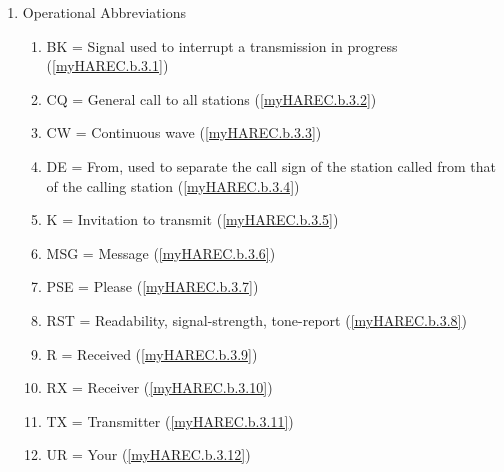 \begin{enumerate}
\begin{enumerate}
  (\ref{myHAREC.b.2.21})\label{HAREC.b.2.21}
\item QSO  = I can communicate ... direct
  (\ref{myHAREC.b.2.22})\label{HAREC.b.2.22}
\item QSY? = Shall I change to transmission on another frequency?
  (\ref{myHAREC.b.2.23})\label{HAREC.b.2.23}
\item QSY  = Change transmission to another frequency
  (\ref{myHAREC.b.2.24})\label{HAREC.b.2.24}
\item QRX? = When will you call again?
  (\ref{myHAREC.b.2.25})\label{HAREC.b.2.25}
\item QRX  = I will call you again at ... hours on ... kHz (or MHz)
  (\ref{myHAREC.b.2.26})\label{HAREC.b.2.26}
\item QTH? = What is your position in latitude and longitude (or according to
  any other indication)? (\ref{myHAREC.b.2.27})\label{HAREC.b.2.27}
\item QTH  = My position is  ... latitude, ... longitude (or according to any
  other indication) (\ref{myHAREC.b.2.28})\label{HAREC.b.2.28}
\end{enumerate}

\item Operational Abbreviations
\begin{enumerate}
\item BK = Signal used to interrupt a transmission in progress
  (\ref{myHAREC.b.3.1})\label{HAREC.b.3.1}
\item CQ = General call to all stations
  (\ref{myHAREC.b.3.2})\label{HAREC.b.3.2}
\item CW = Continuous wave
  (\ref{myHAREC.b.3.3})\label{HAREC.b.3.3}
\item DE = From, used to separate the call sign of the station called from that
  of the calling station (\ref{myHAREC.b.3.4})\label{HAREC.b.3.4}
\item K = Invitation to transmit
  (\ref{myHAREC.b.3.5})\label{HAREC.b.3.5}
\item MSG = Message
  (\ref{myHAREC.b.3.6})\label{HAREC.b.3.6}
\item PSE = Please
  (\ref{myHAREC.b.3.7})\label{HAREC.b.3.7}
\item RST = Readability, signal-strength, tone-report
  (\ref{myHAREC.b.3.8})\label{HAREC.b.3.8}
\item R = Received
  (\ref{myHAREC.b.3.9})\label{HAREC.b.3.9}
\item RX = Receiver
  (\ref{myHAREC.b.3.10})\label{HAREC.b.3.10}
\item TX = Transmitter
  (\ref{myHAREC.b.3.11})\label{HAREC.b.3.11}
\item UR = Your
  (\ref{myHAREC.b.3.12})\label{HAREC.b.3.12}
\end{enumerate}


\end{enumerate}
